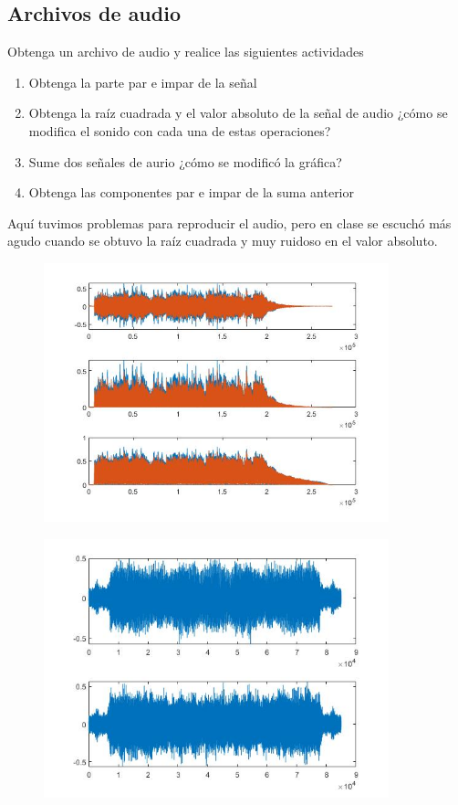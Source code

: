 \documentclass[12pt]{article}
\begin{document}
	\subsection{Archivos de audio}
	Obtenga un archivo de audio y realice las siguientes actividades
	\begin{enumerate}
		\item Obtenga la parte par e impar de la señal
		\item Obtenga la raíz cuadrada y el valor absoluto de la señal de audio ¿cómo se modifica el sonido con cada una de estas operaciones?
		\item Sume dos señales de aurio ¿cómo se modificó la gráfica?
		\item Obtenga las componentes par e impar de la suma anterior
	\end{enumerate}
	Aquí tuvimos problemas para reproducir el audio, pero en clase se escuchó más agudo cuando se obtuvo la raíz cuadrada y muy ruidoso en el valor absoluto.
	
	\begin{figure}[h]
		\centering
		\includegraphics[width=10cm]{6_4_1.jpg}
	\end{figure}
	\begin{figure}[h]
		\centering
		\includegraphics[width=10cm]{6_4_2.jpg}
	\end{figure}
	\newpage
\end{document}
